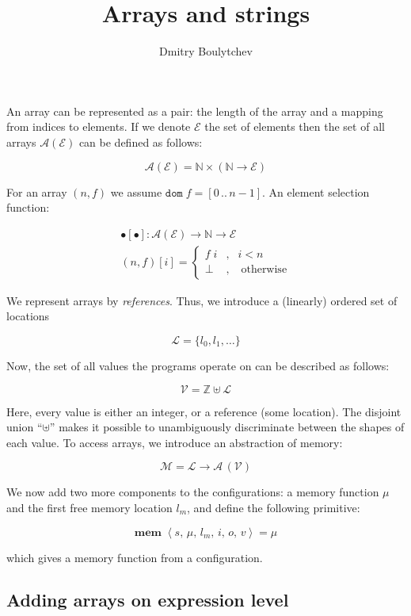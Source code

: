 \documentclass{article}
\title{Arrays and strings}
\author{Dmitry Boulytchev}
\newcommand{\inbr}[1]{\left<{#1}\right>}
\newcommand{\dom}[1]{\mathtt{dom}\;{#1}}
\newcommand{\primi}[2]{\mathbf{#1}\;{#2}}
\theoremstyle{definition}
\begin{document}
\maketitle

An array can be represented as a pair: the length of the array and a mapping from indices to elements. If we denote
$\mathscr E$ the set of elements then the set of all arrays $\mathscr A (\mathscr E)$ can be defined as follows:

\[
\mathscr A(\mathscr E) = \mathbb N \times (\mathbb N \to \mathscr E)
\]

For an array $(n, f)$ we assume $\dom{f}=[0\,..\,n-1]$. An element selection function:

\[
\begin{array}{c}
  \bullet[\bullet] : \mathscr A (\mathscr E) \to \mathbb N \to \mathscr E\\[2mm]
  (n, f) [i] = \left\{
                  \begin{array}{rcl}
                     f\;i &, & i < n\\
                     \bot&,&\;\mbox{otherwise}
                  \end{array}
               \right.
\end{array}
\]

We represent arrays by \emph{references}. Thus, we introduce a (linearly) ordered set of locations

\[
\mathscr L = \{l_0, l_1, \dots\}
\]

Now, the set of all values the programs operate on can be described as follows:

\[
    \mathscr V = \mathbb Z \uplus \mathscr L 
\]

Here, every value is either an integer, or a reference (some location). The disjoint union ``$\uplus$'' makes it possible to
unambiguously discriminate between the shapes of each value. To access arrays, we introduce an abstraction of memory:


\[
    \mathscr M = \mathscr L \to \mathscr A\,(\mathscr V)
\]

We now add two more components to the configurations: a memory function $\mu$ and the first free memory location $l_m$, and
define the following primitive:

\[
\primi{mem}{\inbr{s,\,\mu,\,l_m,\,i,\,o,\,v}}=\mu
\]

which gives a memory function from a configuration.

\subsection{Adding arrays on expression level}
\end{document}
